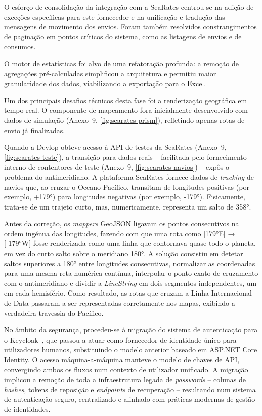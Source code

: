 \documentclass[a4paper,12pt]{report}
\begin{document}
O esforço de consolidação da integração com a SeaRates centrou-se na adição de exceções específicas para este fornecedor e na unificação e tradução das mensagens de movimento dos envios. Foram também resolvidos constrangimentos de paginação em pontos críticos do sistema, como as listagens de envios e de consumos.

O motor de estatísticas foi alvo de uma refatoração profunda: a remoção de agregações pré-calculadas simplificou a arquitetura e permitiu maior granularidade dos dados, viabilizando a exportação para o Excel.

Um dos principais desafios técnicos desta fase foi a renderização geográfica em tempo real. O componente de mapeamento fora inicialmente desenvolvido com dados de simulação (Anexo~9, \autoref{fig:searates-prism}), refletindo apenas rotas de envio já finalizadas.

Quando a Devlop obteve acesso à API de testes da SeaRates (Anexo~9, \autoref{fig:searates-teste}), a transição para dados reais -- facilitada pelo fornecimento interno de contentores de teste (Anexo~9, \autoref{fig:searates-navios}) -- expôs o problema do antimeridiano. A plataforma SeaRates fornece dados de \textit{tracking} de navios que, ao cruzar o Oceano Pacífico, transitam de longitudes positivas (por exemplo, +179°) para longitudes negativas (por exemplo, -179°). Fisicamente, trata-se de um trajeto curto, mas, numericamente, representa um salto de 358°.

Antes da correção, os \textit{mappers} GeoJSON ligavam os pontos consecutivos na ordem ingénua das longitudes, fazendo com que uma rota como [179°E] → [-179°W] fosse renderizada como uma linha que contornava quase todo o planeta, em vez do curto salto sobre o meridiano 180°. A solução consistiu em detetar saltos superiores a 180° entre longitudes consecutivas, normalizar as coordenadas para uma mesma reta numérica contínua, interpolar o ponto exato de cruzamento com o antimeridiano e dividir a \textit{LineString} em dois segmentos independentes, um em cada hemisfério. Como resultado, as rotas que cruzam a Linha Internacional de Data passaram a ser representadas corretamente nos mapas, exibindo a verdadeira travessia do Pacífico.

No âmbito da segurança, procedeu-se à migração do sistema de autenticação para o Keycloak~\cite{keycloak}, que passou a atuar como fornecedor de identidade único para utilizadores humanos, substituindo o modelo anterior baseado em ASP.NET Core Identity. O acesso máquina-a-máquina manteve o modelo de chaves de API, convergindo ambos os fluxos num contexto de utilizador unificado. A migração implicou a remoção de toda a infraestrutura legada de \textit{passwords} -- colunas de \textit{hashes}, tokens de reposição e \textit{endpoints} de recuperação -- resultando num sistema de autenticação seguro, centralizado e alinhado com práticas modernas de gestão de identidades.
\end{document}
